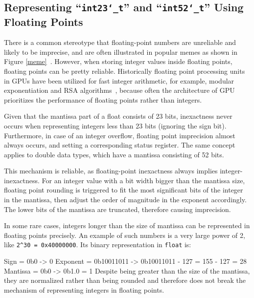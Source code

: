 \documentclass[logo,bsc,singlespacing,parskip]{infthesis}
\newcommand{\dtfloat}{\texttt{float}}
\newcommand{\dtfloati}{\texttt{int23\char`_t}}
\newcommand{\dtdoublei}{\texttt{int52\char`_t}}
\newenvironment{VerbatimCompact}
  {\vspace*{-2.5mm}\VerbatimEnvironment
   \par\Verbatim}
  {\endVerbatim\vspace*{-2.4mm}}
\begin{document}
\subsection{Representing ``\dtfloati{}'' and ``\dtdoublei{}'' Using Floating Points}
\label{sec:fpe2}

There is a common stereotype that floating-point numbers are unreliable and
likely to be imprecise, and are often illustrated in popular memes as shown in
Figure \ref{meme}~\cite{meme}. However, when storing integer values inside
floating points, floating points can be pretty reliable. Historically
floating point processing units in GPUs have been utilized for fast integer
arithmetic, for example, modular exponentiation \cite{intfpu-modexp} and RSA
algorithms~\cite{intfpu-rsa}, because often the architecture of GPU prioritizes
the performance of floating points rather than integers. 

Given that the mantissa part of a float consists of 23 bits,
inexactness never occurs when representing integers less than 23 bits (ignoring
the sign bit). Furthermore, in case of an integer overflow, floating point
imprecision almost always occurs, and setting a corresponding status register.
The same concept applies to double data types, which have a mantissa consisting
of 52 bits.

This mechanism is reliable, as floating-point inexactness always implies
integer-inexactness. For an integer value with a bit width bigger than the
mantissa size, floating point rounding is triggered to fit the most
significant bits of the integer in the mantissa, then adjust the order of
magnitude in the exponent accordingly. The lower bits of the mantissa are
truncated, therefore causing imprecision. 

In some rare cases, integers longer than the size of mantissa can be represented
in floating points precisely. An example of such numbers is a very large power
of 2, like \texttt{2\^{}30 = 0x40000000}. Its binary representation in
\dtfloat{} is:
\begin{VerbatimCompact}
Sign     = 0b0        -> 0     
Exponent = 0b10011011 -> 0b10011011 - 127 = 155 - 127 = 28             
Mantissa = 0b0        -> 0b1.0 = 1
\end{VerbatimCompact}
Despite being greater than the size of
the mantissa, they are normalized rather than being rounded and therefore does
not break the mechanism of representing integers in floating points.


\end{document}
